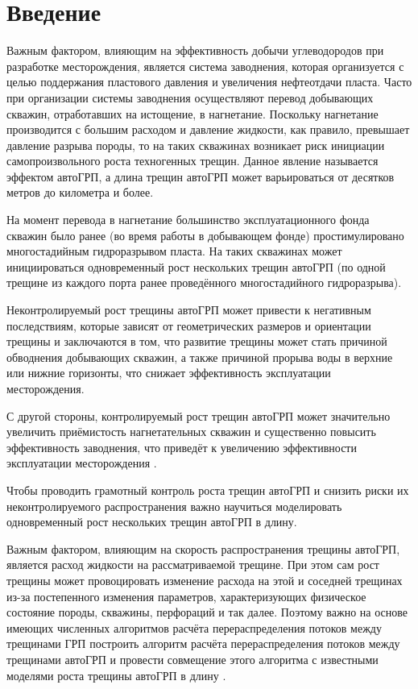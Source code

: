 \chapter*{Введение} %


Важным фактором, влияющим на эффективность добычи углеводородов при разработке месторождения, является система заводнения, которая организуется с целью поддержания пластового давления и увеличения нефтеотдачи пласта.
Часто при организации системы заводнения осуществляют перевод добывающих скважин, отработавших на истощение, в нагнетание.
Поскольку нагнетание производится с большим расходом и давление жидкости, как правило, превышает давление разрыва породы, то на таких скважинах возникает риск инициации самопроизвольного роста техногенных трещин.
Данное явление называется эффектом автоГРП, а длина трещин автоГРП может варьироваться от десятков метров до километра и более.

На момент перевода в нагнетание большинство эксплуатационного фонда скважин было ранее (во время работы в добывающем фонде) простимулировано многостадийным гидроразрывом пласта.
На таких скважинах может инициироваться одновременный рост нескольких трещин автоГРП (по одной трещине из каждого порта ранее проведённого многостадийного гидроразрыва).

Неконтролируемый рост трещины автоГРП может привести к негативным последствиям, которые зависят от геометрических размеров и ориентации трещины и заключаются в том, что развитие трещины может стать причиной обводнения добывающих скважин, а также причиной прорыва воды в верхние или нижние горизонты, что снижает эффективность эксплуатации месторождения.

С другой стороны, контролируемый рост трещин автоГРП может значительно увеличить приёмистость нагнетательных скважин и существенно повысить эффективность заводнения, что приведёт к увеличению эффективности эксплуатации месторождения \cite{bazyrov_shel, yakupov}.

Чтобы проводить грамотный контроль роста трещин автоГРП и снизить риски их неконтролируемого распространения важно научиться моделировать одновременный рост нескольких трещин автоГРП в длину.

Важным фактором, влияющим на скорость распространения трещины автоГРП, является расход жидкости на рассматриваемой трещине.
При этом сам рост трещины может провоцировать изменение расхода на этой и соседней трещинах из-за постепенного изменения параметров, характеризующих физическое состояние породы, скважины, перфораций и так далее.
Поэтому важно на основе имеющих численных алгоритмов расчёта перераспределения потоков между трещинами ГРП \cite{elbel} построить алгоритм расчёта перераспределения потоков между трещинами автоГРП и провести совмещение этого алгоритма с известными моделями роста трещины автоГРП в длину \cite{koning}.

